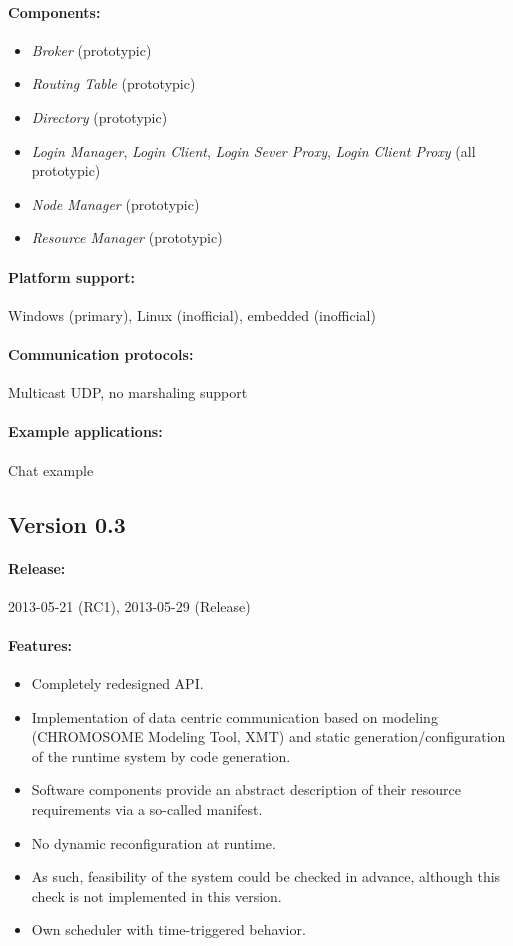 \paragraph{Components:}
\begin{itemize}
	\item \emph{Broker} (prototypic)
	\item \emph{Routing Table} (prototypic)
	\item \emph{Directory} (prototypic)
	\item \emph{Login Manager}, \emph{Login Client}, \emph{Login Sever Proxy}, \emph{Login Client Proxy} (all prototypic)
	\item \emph{Node Manager} (prototypic)
	\item \emph{Resource Manager} (prototypic)
\end{itemize}

\paragraph{Platform support:} Windows (primary), Linux (inofficial), embedded (inofficial)
\paragraph{Communication protocols:} Multicast UDP, no marshaling support
\paragraph{Example applications:} Chat example



\subsection{Version 0.3}

\paragraph{Release:} 2013-05-21 (RC1), 2013-05-29 (Release)

\paragraph{Features:}
\begin{itemize}
	\item Completely redesigned API.
	\item Implementation of data centric communication based on modeling (CHROMOSOME Modeling Tool, XMT) and static generation/configuration of the runtime system by code generation.
	\item Software components provide an abstract description of their resource requirements via a so-called manifest.
	\item No dynamic reconfiguration at runtime.
	\item As such, feasibility of the system could be checked in advance, although this check is not implemented in this version.
	\item Own scheduler with time-triggered behavior.
\end{itemize}


